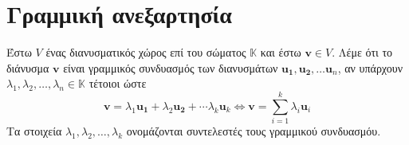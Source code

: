 \section{Γραμμική ανεξαρτησία}

\begin{dfn}
    Έστω $ V $ ένας διανυσματικός χώρος επί του σώματος $ \mathbb{K} $ και έστω 
    $ \mathbf{v} \in V $. Λέμε ότι το διάνυσμα $ \mathbf{v}$ είναι γραμμικός 
    συνδυασμός των διανυσμάτων 
    $ \mathbf{u_{1}}, \mathbf{u_{2}}, \ldots \mathbf{u}_{n} $, αν υπάρχουν 
    $ \lambda _{1}, \lambda _{2}, \ldots, \lambda _{n} \in \mathbb{K} $ τέτοιοι ώστε 
    \[
        \mathbf{v} = \lambda _{1} \mathbf{u_{1}}+ \lambda_{2} \mathbf{u_{2}}+ 
        \cdots \lambda _{k} \mathbf{u}_{k} \Leftrightarrow \mathbf{v} = 
        \sum_{i=1}^{k} \lambda _{i} \mathbf{u}_{i} 
    \]
    Τα στοιχεία $ \lambda _{1}, \lambda _{2}, \ldots, \lambda _{k} $ ονομάζονται 
    συντελεστές τους γραμμικού συνδυασμόυ.
\end{dfn}

